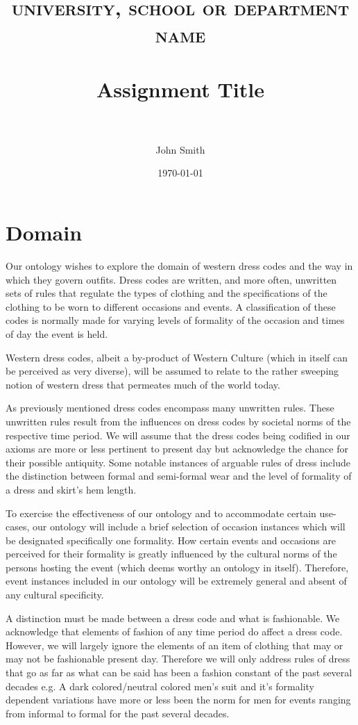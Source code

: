 \documentclass[paper=a4, fontsize=11pt]{scrartcl} %
\title{	
\normalfont \normalsize 
\textsc{university, school or department name} \\ [25pt] %
\horrule{0.5pt} \\[0.4cm] %
\huge Assignment Title \\ %
\horrule{2pt} \\[0.5cm] %
}
\author{John Smith} %
\date{\normalsize\today} %
\numberwithin{equation}{section} %
\numberwithin{figure}{section} %
\numberwithin{table}{section} %
\begin{document}
\section{Domain}
Our ontology wishes to explore the domain of western dress codes and the way in which they govern outfits. Dress codes are written, and more often, unwritten sets of rules that regulate the types of clothing and the specifications of the clothing to be worn to different occasions and events. A classification of these codes is normally made for varying levels of formality of the occasion and times of day the event is held. 

Western dress codes, albeit a by-product of Western Culture (which in itself can be perceived as very diverse), will be assumed to relate to the rather sweeping notion of western dress that permeates much of the world today. 

As previously mentioned dress codes encompass many unwritten rules. These unwritten rules result from the influences on dress codes by societal norms of the respective time period. We will assume that the dress codes being codified in our axioms are more or less pertinent to present day but acknowledge the chance for their possible antiquity. Some notable  instances of arguable rules of dress include the distinction between formal and semi-formal wear and the level of formality of a dress and skirt's hem length. 

To exercise the effectiveness of our ontology and to accommodate certain use-cases, our ontology will include a brief selection of occasion instances which will be designated specifically one formality. How certain events and occasions are perceived for their formality is greatly influenced by the cultural norms of the persons hosting the event (which deems worthy an ontology in itself). Therefore, event instances included in our ontology will be extremely general and absent of any cultural specificity.

A distinction must be made between a dress code and what is fashionable. We acknowledge that elements of fashion of any time period do affect a dress code. However, we will largely ignore the elements of an item of clothing that may or may not be fashionable present day. Therefore we will only address rules of dress that go as far as what can be said has been a fashion constant of the past several decades e.g. A dark colored/neutral colored men's suit and it's formality dependent variations have more or less been the norm for men for events ranging from informal to formal for the past several decades.
\end{document}
